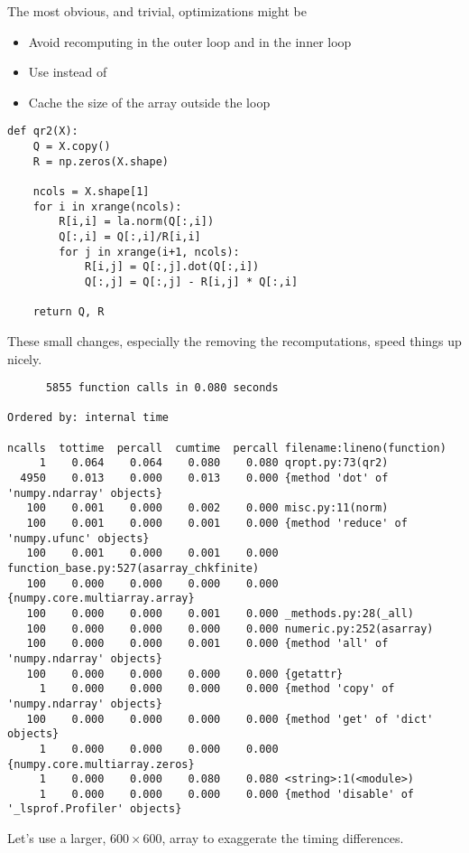 The most obvious, and trivial, optimizations might be 
\begin{itemize}
\item Avoid recomputing  in the outer loop and  in the inner loop
\item Use  instead of 
\item Cache the size of the array outside the loop
\end{itemize}
\begin{lstlisting}
def qr2(X):
    Q = X.copy()
    R = np.zeros(X.shape)

    ncols = X.shape[1]
    for i in xrange(ncols):
        R[i,i] = la.norm(Q[:,i])
        Q[:,i] = Q[:,i]/R[i,i]
        for j in xrange(i+1, ncols):
            R[i,j] = Q[:,j].dot(Q[:,i])
            Q[:,j] = Q[:,j] - R[i,j] * Q[:,i]

    return Q, R
\end{lstlisting}
These small changes, especially the removing the recomputations, speed things up nicely.
{\scriptsize
\begin{verbatim}
      5855 function calls in 0.080 seconds

Ordered by: internal time

ncalls  tottime  percall  cumtime  percall filename:lineno(function)
     1    0.064    0.064    0.080    0.080 qropt.py:73(qr2)
  4950    0.013    0.000    0.013    0.000 {method 'dot' of 'numpy.ndarray' objects}
   100    0.001    0.000    0.002    0.000 misc.py:11(norm)
   100    0.001    0.000    0.001    0.000 {method 'reduce' of 'numpy.ufunc' objects}
   100    0.001    0.000    0.001    0.000 function_base.py:527(asarray_chkfinite)
   100    0.000    0.000    0.000    0.000 {numpy.core.multiarray.array}
   100    0.000    0.000    0.001    0.000 _methods.py:28(_all)
   100    0.000    0.000    0.000    0.000 numeric.py:252(asarray)
   100    0.000    0.000    0.001    0.000 {method 'all' of 'numpy.ndarray' objects}
   100    0.000    0.000    0.000    0.000 {getattr}
     1    0.000    0.000    0.000    0.000 {method 'copy' of 'numpy.ndarray' objects}
   100    0.000    0.000    0.000    0.000 {method 'get' of 'dict' objects}
     1    0.000    0.000    0.000    0.000 {numpy.core.multiarray.zeros}
     1    0.000    0.000    0.080    0.080 <string>:1(<module>)
     1    0.000    0.000    0.000    0.000 {method 'disable' of '_lsprof.Profiler' objects}
\end{verbatim}
}
Let's use a larger, $600 \times 600$, array to exaggerate the timing differences.
